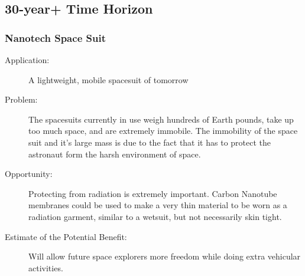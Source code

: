 \subsection{30-year+ Time Horizon}

\subsubsection{Nanotech  Space Suit } 
\begin{description}  \item[Application:] A lightweight, mobile spacesuit of tomorrow
 
\item[Problem:] The spacesuits  currently in use weigh hundreds of Earth pounds, take up too much space,  and are extremely immobile. The immobility of the space suit and it's  large mass is due to the fact that it has to protect the astronaut form  the harsh environment of space. 
 
\item[Opportunity:] Protecting  from radiation is extremely important. Carbon Nanotube membranes could  be used to make a very thin material to be worn as a radiation garment,  similar to a wetsuit, but not necessarily skin tight. 
 
\item[Estimate of the Potential  Benefit:]Will allow future space explorers more freedom while doing  extra vehicular activities.
\end{description}

 
